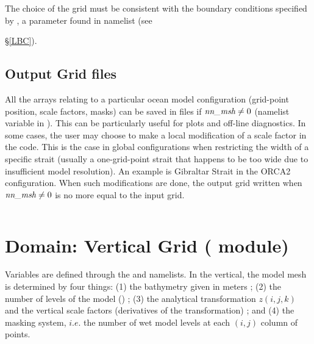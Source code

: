 \documentclass[NEMO_book]{subfiles}
\begin{document}
The choice of the grid must be consistent with the boundary conditions specified 
by , a parameter found in  namelist (see {\S\ref{LBC}).

\subsection{Output Grid files}
\label{DOM_hgr_files}

All the arrays relating to a particular ocean model configuration (grid-point 
position, scale factors, masks) can be saved in files if $\np{nn\_msh} \not= 0$ 
(namelist variable in ). This can be particularly useful for plots and off-line 
diagnostics. In some cases, the user may choose to make a local modification 
of a scale factor in the code. This is the case in global configurations when 
restricting the width of a specific strait (usually a one-grid-point strait that 
happens to be too wide due to insufficient model resolution). An example 
is Gibraltar Strait in the ORCA2 configuration. When such modifications are done, 
the output grid written when $\np{nn\_msh} \not=0$ is no more equal to the input grid.

$\ $\newline    %

\section  [Domain: Vertical Grid (\textit{domzgr})]
		{Domain: Vertical Grid \small{( module)} }
\label{DOM_zgr}

Variables are defined through the  and  namelists.
In the vertical, the model mesh is determined by four things: 
(1) the bathymetry given in meters ; 
(2) the number of levels of the model () ; 
(3) the analytical transformation $z(i,j,k)$ and the vertical scale factors 
(derivatives of the transformation) ; 
and (4) the masking system, $i.e.$ the number of wet model levels at each 
$(i,j)$ column of points.

}
\end{document}
